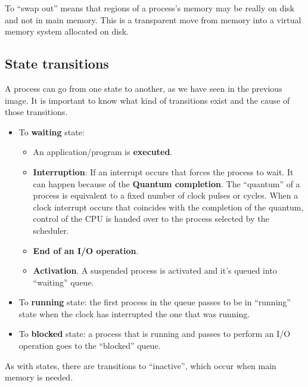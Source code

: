 To “swap out” means that regions of a process's memory may be really on disk and not in main memory. This is a transparent move from memory into a virtual memory system allocated on disk.


\subsection{State transitions}

A process can go from one state to another, as we have seen in the previous image. It is important to know what kind of transitions exist and the cause of those transitions.

\begin{itemize}


    \item To \textbf{waiting} state:
    \begin{itemize}
        \item An application/program is \textbf{executed}.

        \item \textbf{Interruption}: If an interrupt occurs that forces the process to wait. It can happen because of the \textbf{Quantum completion}. The “quantum” of a process is equivalent to a fixed number of clock pulses or cycles. When a clock interrupt occurs that coincides with the completion of the quantum, control of the CPU is handed over to the process selected by the scheduler.

        \item \textbf{End of an I/O operation}.

        \item \textbf{Activation}. A suspended process is activated and it's queued into “waiting” queue.
    \end{itemize}

    \item To \textbf{running} state: the first process in the queue passes
    to be in “running” state when the clock has interrupted the one that was running.

    \item To \textbf{blocked} state: a process that is running and passes to
    perform an I/O operation goes to the “blocked” queue.
\end{itemize}

As with states, there are transitions to “inactive”, which occur when main memory is needed.

